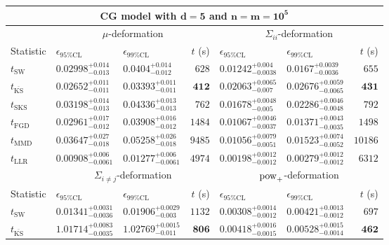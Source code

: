 \begin{tabular}{l|llr|llr}
	\toprule
	\multicolumn{7}{c}{{\bf CG model with $\mathbf{d=5}$ and $\mathbf{n=m=10^{5}}$}} \\
	\toprule
	\multicolumn{1}{c}{} & \multicolumn{3}{c}{$\mu$-deformation} & \multicolumn{3}{c}{$\Sigma_{ii}$-deformation} \\
	Statistic & $\epsilon_{95\%\mathrm{CL}}$ & $\epsilon_{99\%\mathrm{CL}}$ & $t$ (s) & $\epsilon_{95\%\mathrm{CL}}$ & $\epsilon_{99\%\mathrm{CL}}$ & $t$ (s) \\
	\midrule
	$t_{\mathrm{SW}}$ & $0.02998_{-0.013}^{+0.014}$ & $0.0404_{-0.012}^{+0.014}$ & $628$ & $0.01242_{-0.0038}^{+0.004}$ & $0.0167_{-0.0036}^{+0.0039}$ & $655$ \\
	$t_{\overline{\mathrm{KS}}}$ & ${\mathbf{0.02652_{-0.011}^{+0.011}}}$ & ${\mathbf{0.03393_{-0.011}^{+0.011}}}$ & ${\mathbf{412}}$ & $0.02063_{-0.007}^{+0.0065}$ & $0.02676_{-0.0065}^{+0.0059}$ & ${\mathbf{431}}$ \\
	$t_{\mathrm{SKS}}$ & $0.03198_{-0.013}^{+0.014}$ & $0.04336_{-0.013}^{+0.013}$ & $762$ & $0.01678_{-0.005}^{+0.0048}$ & $0.02286_{-0.0048}^{+0.0046}$ & $792$ \\
	$t_{\mathrm{FGD}}$ & $0.02961_{-0.012}^{+0.017}$ & $0.03908_{-0.012}^{+0.016}$ & $1484$ & $0.01067_{-0.0037}^{+0.0046}$ & ${\mathbf{0.01371_{-0.0035}^{+0.0043}}}$ & $1498$ \\
	$t_{\mathrm{MMD}}$ & $0.03647_{-0.018}^{+0.027}$ & $0.05258_{-0.018}^{+0.026}$ & $9485$ & ${\mathbf{0.01056_{-0.0051}^{+0.0079}}}$ & $0.01523_{-0.0052}^{+0.0074}$ & $10186$ \\
	$t_{\mathrm{LLR}}$ & $0.00908_{-0.0061}^{+0.006}$ & $0.01277_{-0.0061}^{+0.006}$ & $4974$ & $0.00198_{-0.0012}^{+0.0012}$ & $0.00279_{-0.0012}^{+0.0012}$ & $6312$ \\
	\toprule
	\multicolumn{1}{c}{} & \multicolumn{3}{c}{$\Sigma_{i\neq j}$-deformation} & \multicolumn{3}{c}{$\rm{pow}_{+}$-deformation} \\
	Statistic & $\epsilon_{95\%\mathrm{CL}}$ & $\epsilon_{99\%\mathrm{CL}}$ & $t$ (s) & $\epsilon_{95\%\mathrm{CL}}$ & $\epsilon_{99\%\mathrm{CL}}$ & $t$ (s) \\
	\midrule
	$t_{\mathrm{SW}}$ & $0.01341_{-0.0036}^{+0.0031}$ & $0.01906_{-0.003}^{+0.0029}$ & $1132$ & $0.00308_{-0.0012}^{+0.0014}$ & $0.00421_{-0.0012}^{+0.0013}$ & $697$ \\
	$t_{\overline{\mathrm{KS}}}$ & $1.01714_{-0.0035}^{+0.0083}$ & $1.02769_{-0.011}^{+0.0015}$ & ${\mathbf{806}}$ & $0.00418_{-0.0015}^{+0.0016}$ & $0.00528_{-0.0014}^{+0.0015}$ & ${\mathbf{462}}$ \\

\end{tabular}

